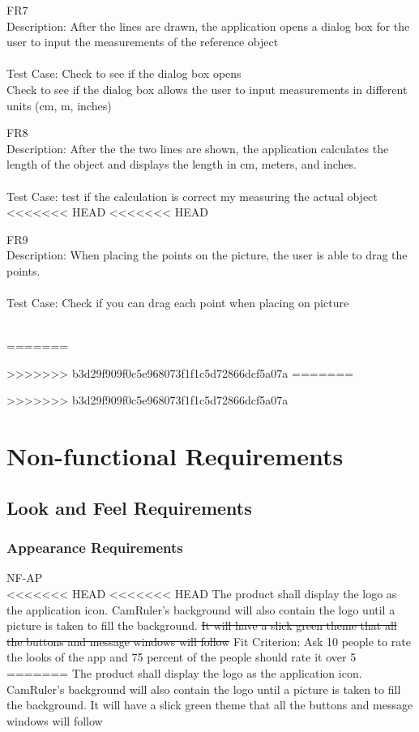 \documentclass[12pt, titlepage]{article}
\begin{document}
\begin{enumerate}{}{}
\item FR7 \\Description: After the lines are drawn, the application opens a dialog box for the user to input the measurements of the reference object \\ \\
 Test Case: Check to see if the dialog box opens\\
  Check to see if the dialog box allows the user to input measurements in different units (cm, m, inches)

\item FR8 \\Description: After the the two lines are shown, the application calculates the length of the object and displays the length in cm, meters, and inches. \\	  \\
 Test Case: test if the calculation is correct my measuring the actual object \\
<<<<<<< HEAD
<<<<<<< HEAD
 
 {\color{red}\item FR9 \\Description: When placing the points on the picture, the user is able to drag the points. \\	  \\
 Test Case: Check if you can drag each point when placing on picture }\\

 
=======

>>>>>>> b3d29f909f0c5e968073f1f1c5d72866dcf5a07a
=======

>>>>>>> b3d29f909f0c5e968073f1f1c5d72866dcf5a07a
\end{enumerate}
\section{Non-functional Requirements}

\subsection{Look and Feel Requirements}
\subsubsection{Appearance Requirements}
NF-AP \\
<<<<<<< HEAD
<<<<<<< HEAD
The product shall display the logo as the application icon. CamRuler’s background will also contain the logo until a picture is taken to fill the background. \sout{It will have a slick green theme that all the buttons and message windows will follow}
{\color{red}Fit Criterion: Ask 10 people to rate the looks of the app and  75 percent of the people should rate it over 5 }
=======
The product shall display the logo as the application icon. CamRuler’s background will also contain the logo until a picture is taken to fill the background. It will have a slick green theme that all the buttons and message windows will follow
\end{document}
